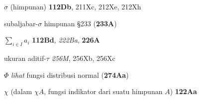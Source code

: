 

{$\sigma$ }
(himpunan) {\bf 112Db},
  211Xc, 212Xe, 212Xh




























subaljabar-$\sigma$ himpunan \S233 ({\bf 233A})






\indexmedskip
\indexheader{$\scriptstyle\pmb{\Sigma}$}







$\sum_{i\in I}a_i$ {\bf 112Bd}, {\it 222Ba}, {\bf 226A}
  

\indexmedskip
\indexheader{$\scriptstyle\pmb{\tau}$}





ukuran aditif-$\tau$ {\it 256M}, 256Xb, 256Xc

























\indexmedskip
\indexiiheader{$\scriptstyle\pmb{\Phi}$}

$\Phi$ {\it lihat} fungsi distribusi normal ({\bf 274Aa})


\indexmedskip
\indexheader{$\scriptstyle\pmb{\chi}$}

$\chi$ (dalam $\chi A$, fungsi indikator dari suatu himpunan $A$)
{\bf 122Aa}





